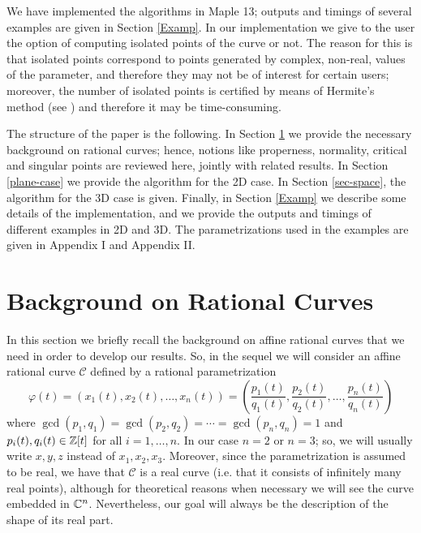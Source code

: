 \documentclass{elsart}
\begin{document}
We have implemented the algorithms in Maple 13; outputs and
timings of several examples are given in Section \ref{Examp}. In
our implementation we give to the user the option of computing
isolated points of the curve or not. The reason for this is that
isolated points correspond to points generated by complex,
non-real, values of the parameter, and therefore they may not be
of interest for certain users; moreover, the number of isolated
points is certified by means of Hermite's method (see \cite{cox})
and therefore it may be time-consuming.

The structure of the paper is the following. In Section
\ref{sec-background} we provide the necessary background on
rational curves; hence, notions like properness, normality,
critical and singular points are reviewed here, jointly with
related results. In Section \ref{plane-case} we provide the
algorithm for the 2D case. In Section \ref{sec-space}, the
algorithm for the 3D case is given. Finally, in Section
\ref{Examp} we describe some details of the implementation, and we
provide the outputs and timings of different examples in 2D and
3D. The parametrizations used in the examples
are given in Appendix I and Appendix II.


\section{Background on Rational Curves}\label{sec-background}

In this section we briefly recall the background on affine rational curves
that we need in order to develop our results. So, in the sequel
we will consider an affine rational
curve ${\mathcal C}$ defined by a rational parametrization
\[\varphi(t)=\left(x_1(t),x_2(t),\ldots,x_n(t)\right)=\left(\displaystyle{\frac{p_1(t)}{q_1(t)}},\displaystyle{\frac{p_2(t)}{q_2(t)}},\ldots,\displaystyle{\frac{p_n(t)}{q_n(t)}}\right)\]
where $\gcd(p_1,q_1)=\gcd(p_2,q_2)=\cdots=\gcd(p_n,q_n)=1$ and $p_i(t),q_i(t)\in {\Bbb Z}[t]$ for all $i=1,\ldots,n$. In our case $n=2$ or $n=3$; so, we will usually write $x,y,z$ instead of $x_1,x_2,x_3$. Moreover, since the parametrization is assumed to be real, we have that ${\mathcal C}$ is a real curve (i.e. that it consists of infinitely many real points), although for theoretical reasons when necessary we will see the curve embedded in ${\Bbb C}^n$. Nevertheless, our goal will always be the description of the shape of its real part.
\end{document}

